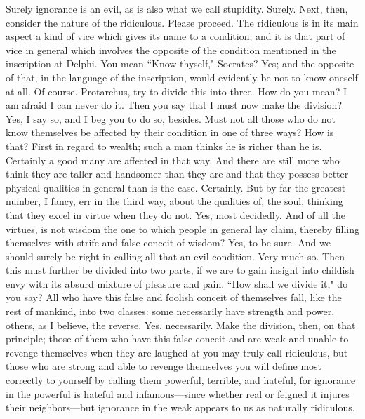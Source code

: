 \documentclass[letterpaper,12pt]{article}
\newcommand{\stephpag}[1]{\marginnote{\small\itshape\fontfamily{ppl}\selectfont #1}}
\begin{document}
\begin{drama}
\socratesspeaks
Surely ignorance is an evil, as is also what we call stupidity.
\protarchusspeaks
Surely.
\socratesspeaks
Next, then, consider the nature of the ridiculous.
\protarchusspeaks
Please proceed.
\socratesspeaks
The ridiculous is in its main aspect a kind of vice which gives its name to a condition; and it is that part of vice in general which involves the opposite of the condition mentioned in the inscription at Delphi.
\protarchusspeaks
You mean ``Know thyself," Socrates? \stephpag{d}
\socratesspeaks
Yes; and the opposite of that, in the language of the inscription, would evidently be not to know oneself at all.
\protarchusspeaks
Of course.
\socratesspeaks
Protarchus, try to divide this into three.
\protarchusspeaks
How do you mean? I am afraid I can never do it.
\socratesspeaks
Then you say that I must now make the division?
\protarchusspeaks
Yes, I say so, and I beg you to do so, besides.
\socratesspeaks
Must not all those who do not know themselves be affected by their condition in one of three ways?
\protarchusspeaks
How is that?
\socratesspeaks
First in regard to wealth; such a man thinks he is \stephpag{e} richer than he is.
\protarchusspeaks
Certainly a good many are affected in that way.
\socratesspeaks
And there are still more who think they are taller and handsomer than they are and that they possess better physical qualities in general than is the case.
\protarchusspeaks
Certainly. \stephpag{49 a}
\socratesspeaks
But by far the greatest number, I fancy, err in the third way, about the qualities of, the soul, thinking that they excel in virtue when they do not.
\protarchusspeaks
Yes, most decidedly.
\socratesspeaks
And of all the virtues, is not wisdom the one to which people in general lay claim, thereby filling themselves with strife and false conceit of wisdom?
\protarchusspeaks
Yes, to be sure.
\socratesspeaks
And we should surely be right in calling all that an evil condition.
\protarchusspeaks
Very much so.
\socratesspeaks
Then this must further be divided into two parts, if we are to gain insight into childish envy with its absurd mixture of pleasure and pain. ``How shall we divide it," do you say? All who have this false and foolish conceit \stephpag{b} of themselves fall, like the rest of mankind, into two classes: some necessarily have strength and power, others, as I believe, the reverse.
\protarchusspeaks
Yes, necessarily.
\socratesspeaks
Make the division, then, on that principle; those of them who have this false conceit and are weak and unable to revenge themselves when they are laughed at you may truly call ridiculous, but those who are strong and able to revenge themselves you will define most correctly to yourself \stephpag{c} by calling them powerful, terrible, and hateful, for ignorance in the powerful is hateful and infamous---since whether real or feigned it injures their neighbors---but ignorance in the weak appears to us as naturally ridiculous.

\end{drama}
\end{document}
